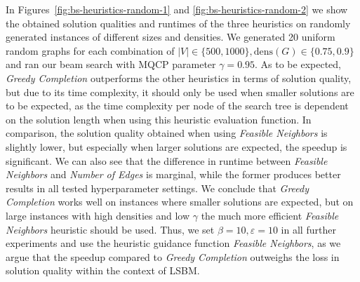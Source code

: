 \documentclass[draft,final]{vutinfth} %
\begin{document}
In Figures~\ref{fig:bs-heuristics-random-1} and \ref{fig:bs-heuristics-random-2} 
we show the obtained solution qualities and runtimes of the three heuristics on randomly generated instances of different sizes and densities. We generated 20 uniform random graphs for each combination of $|V| \in \{500, 1000\}, \mathrm{dens}(G) \in \{0.75, 0.9\}$ and ran our beam search with MQCP parameter $\gamma=0.95$. 
As to be expected, \emph{Greedy Completion} outperforms the other heuristics in terms of solution quality, but due to its time complexity, it should only be used when smaller solutions are to be expected, as the time complexity per node of the search tree is dependent on the solution length when using this heuristic evaluation function. 
In comparison, the solution quality obtained when using \emph{Feasible Neighbors} is slightly lower, but especially when larger solutions are expected, the speedup is significant.  
We can also see that the difference in runtime between \emph{Feasible Neighbors} and \emph{Number of Edges} is marginal, while the former produces better results in all tested hyperparameter settings. 
We conclude that \emph{Greedy Completion} works well on instances where smaller solutions are expected, but on large instances with high densities and low $\gamma$ the much more efficient \emph{Feasible Neighbors} heuristic should be used. 
Thus, we set $\beta=10, \varepsilon=10$ in all further experiments and use the heuristic guidance function \emph{Feasible Neighbors}, as we argue that the speedup compared to \emph{Greedy Completion} outweighs the loss in solution quality within the context of LSBM. 


\end{document}
